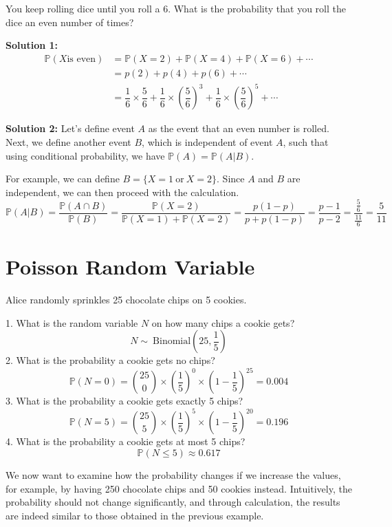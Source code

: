 \begin{eg}
You keep rolling dice until you roll a 6. What is the probability that you roll the dice an even number of times?

\textbf{Solution 1:} 
\[
\begin{aligned}
  \mathbb{P}(X \text{is even}) &= \mathbb{P}(X = 2) + \mathbb{P}(X = 4) + \mathbb{P}(X = 6) + \cdots \\
  &= p(2) + p(4) + p(6) + \cdots \\
  &= \dfrac{1}{6} \times \dfrac{5}{6} + \dfrac{1}{6} \times \left(\dfrac{5}{6}\right)^3 + \dfrac{1}{6} \times \left(\dfrac{5}{6}\right)^5 + \cdots
\end{aligned}
\]

\textbf{Solution 2:}
Let's define event \(A\) as the event that an even number is rolled. Next, we define another event \(B\), which is independent of event \(A\), such that using conditional probability, we have \(\mathbb{P}(A) = \mathbb{P}(A \vert B)\). 

For example, we can define \(B = \{X = 1\ \text{or}\ X = 2\}\). Since \(A\) and \(B\) are independent, we can then proceed with the calculation.
\[
  \mathbb{P}(A \vert B) = \dfrac{\mathbb{P}(A \cap B)}{\mathbb{P}(B)} = \dfrac{\mathbb{P}(X = 2)}{\mathbb{P}(X = 1) + \mathbb{P}(X = 2)} = \dfrac{p(1 - p)}{p + p(1 - p)} = \dfrac{p - 1}{p - 2} = \dfrac{\frac{5}{6}}{\frac{11}{6}} = \dfrac{5}{11}
\]
\end{eg}

\newpage
\section{Poisson Random Variable}
\begin{eg}
  Alice randomly sprinkles 25 chocolate chips on 5 cookies.
  
  1. What is the random variable \(N\) on how many chips a cookie gets?
  \[
    N \sim\ \text{Binomial}(25, \frac{1}{5})
  \]
  2. What is the probability a cookie gets no chips?
  \[
    \mathbb{P}(N = 0) = \binom{25}{0} \times (\dfrac{1}{5})^0 \times (1 - \dfrac{1}{5})^{25} = 0.004
  \]
  3. What is the probability a cookie gets exactly 5 chips?
  \[
    \mathbb{P}(N = 5) = \binom{25}{5} \times (\dfrac{1}{5})^5 \times (1 - \dfrac{1}{5})^{20} = 0.196
  \]
  4. What is the probability a cookie gets at most 5 chips?
  \[
    \mathbb{P}(N \leq 5) \approx 0.617
  \]
\end{eg}

We now want to examine how the probability changes if we increase the values, for example, by having 250 chocolate chips and 50 cookies instead. Intuitively, the probability should not change significantly, and through calculation, the results are indeed similar to those obtained in the previous example. 

